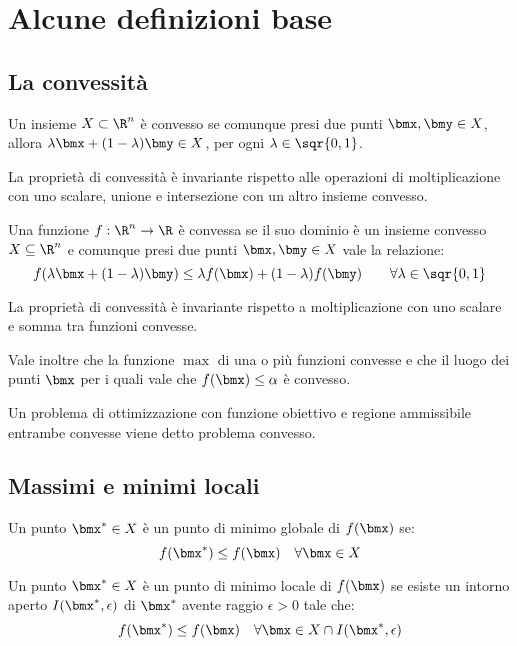 \documentclass[\main/main.tex]{subfiles}
\begin{document}
\chapter{Alcune definizioni base}
\section{La convessità}
\begin{definition}
	Un insieme \(X \subset \R^n\) è convesso se comunque presi due punti \(\bmx,\bmy \in X\), allora \(\lambda\bmx + (1-\lambda)\bmy \in X\), per ogni \(\lambda \in \sqr{0,1}\).

	La proprietà di convessità è invariante rispetto alle operazioni di moltiplicazione con uno scalare, unione e intersezione con un altro insieme convesso.
\end{definition}
\begin{definition}
	Una funzione \(f: \R^n \rightarrow \R \) è convessa se il suo dominio è un insieme convesso \(X \subseteq \R^n\) e comunque presi due punti \(\bmx, \bmy \in X\) vale la relazione:
	\[
		f(\lambda\bmx + (1-\lambda)\bmy) \leq \lambda f(\bmx) + (1-\lambda)f(\bmy) \qquad \forall \lambda \in \sqr{0,1}
	\]

	La proprietà di convessità è invariante rispetto a moltiplicazione con uno scalare e somma tra funzioni convesse.

	Vale inoltre che la funzione \(\max \) di una o più funzioni convesse e che il luogo dei punti \(\bmx \) per i quali vale che \(f(\bmx) \leq \alpha \) è convesso.
\end{definition}
\begin{definition}
	Un problema di ottimizzazione con funzione obiettivo e regione ammissibile entrambe convesse viene detto problema convesso.
\end{definition}
\section{Massimi e minimi locali}
\begin{definition}
	Un punto \(\bmx^* \in X\) è un punto di minimo globale di \(f(\bmx)\) se:
	\[
		f(\bmx^*) \leq f(\bmx) \quad \forall \bmx \in X
	\]
\end{definition}
\begin{definition}
	Un punto \(\bmx^* \in X\) è un punto di minimo locale di \(f(\bmx)\) se esiste un intorno aperto \(I(\bmx^*, \epsilon)\) di \(\bmx^*\) avente raggio \(\epsilon >0\) tale che:
	\[
		f(\bmx^*) \leq f(\bmx) \quad \forall \bmx \in X \cap I(\bmx^*, \epsilon)
	\]
\end{definition}
\end{document}

